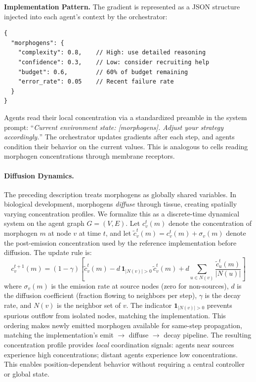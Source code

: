 \textbf{Implementation Pattern.} The gradient is represented as a JSON structure injected into each agent's
context by the orchestrator:
\begin{verbatim}
{
  "morphogens": {
    "complexity": 0.8,    // High: use detailed reasoning
    "confidence": 0.3,    // Low: consider recruiting help
    "budget": 0.6,        // 60% of budget remaining
    "error_rate": 0.05    // Recent failure rate
  }
}
\end{verbatim}
Agents read their local concentration via a standardized preamble in the system prompt:
``\textit{Current environment state: [morphogens]. Adjust your strategy accordingly.}''
The orchestrator updates gradients after each step, and agents condition their behavior on the current values.
This is analogous to cells reading morphogen concentrations through membrane receptors.

\paragraph{Diffusion Dynamics.}
The preceding description treats morphogens as globally shared variables. In biological development, morphogens \textit{diffuse} through tissue, creating spatially varying concentration profiles. We formalize this as a discrete-time dynamical system on the agent graph $G = (V, E)$. Let $c_v^t(m)$ denote the concentration of morphogen $m$ at node $v$ at time $t$, and let $\tilde{c}_v^t(m) = c_v^t(m) + \sigma_v(m)$ denote the post-emission concentration used by the reference implementation before diffusion. The update rule is:
\begin{equation}
c_v^{t+1}(m) = (1 - \gamma)\left[\tilde{c}_v^t(m) - d\,\mathbf{1}_{|N(v)|>0}\,\tilde{c}_v^t(m) + d \sum_{u \in N(v)} \frac{\tilde{c}_u^t(m)}{|N(u)|}\right]
\label{eq:morphogen-diffusion}
\end{equation}
where $\sigma_v(m)$ is the emission rate at source nodes (zero for non-sources), $d$ is the diffusion coefficient (fraction flowing to neighbors per step), $\gamma$ is the decay rate, and $N(v)$ is the neighbor set of $v$. The indicator $\mathbf{1}_{|N(v)|>0}$ prevents spurious outflow from isolated nodes, matching the implementation. This ordering makes newly emitted morphogen available for same-step propagation, matching the implementation's emit $\to$ diffuse $\to$ decay pipeline. The resulting concentration profile provides \textit{local} coordination signals: agents near sources experience high concentrations; distant agents experience low concentrations. This enables position-dependent behavior without requiring a central controller or global state.

